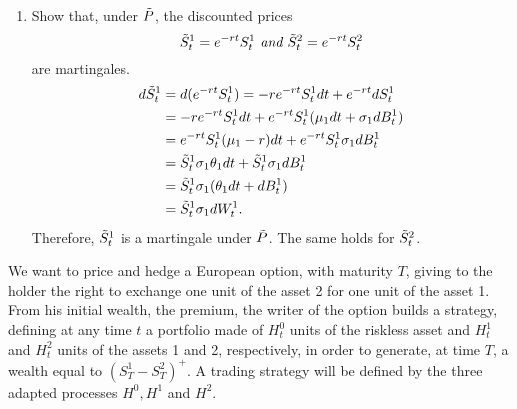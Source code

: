 \documentclass[11pt,a4,table]{article}
\begin{document}
\begin{enumerate}
\begin{enumerate}
        \item Show that, under $\Tilde{P}$, the discounted prices
        \begin{equation*}
            \Tilde{S}_t^1=e^{-rt}S_t^1 \textit{ and } \Tilde{S}_t^2 = e^{-rt} S_t^2
        \end{equation*}
        are martingales.\\
        \begin{align*}
            d\Tilde{S}_t^1 &= d(e^{-rt}S_t^1) = -re^{-rt}S_t^1 dt + e^{-rt} dS_t^1\\
            &= -re^{-rt}S_t^1 dt + e^{-rt}S_t^1(\mu_1 dt + \sigma_1 dB_t^1)\\
            &= e^{-rt}S_t^1(\mu_1 - r) dt + e^{-rt}S_t^1\sigma_1 dB_t^1\\
            &= \Tilde{S}_t^1\sigma_1\theta_1 dt + \Tilde{S}_t^1\sigma_1 dB_t^1\\
            &= \Tilde{S}_t^1\sigma_1(\theta_1 dt + dB_t^1)\\
            &= \Tilde{S}_t^1\sigma_1 dW_t^1.
        \end{align*}
        Therefore, $\Tilde{S}_t^1$ is a martingale under $\Tilde{P}$. The same holds for $\Tilde{S}_t^2$.
    \end{enumerate}
    
    We want to price and hedge a European option, with maturity $T$, giving to the holder the right to exchange one unit of the asset 2 for one unit of the asset 1. From his initial wealth, the premium, the writer of the option builds a strategy, defining at any time $t$ a portfolio made of $H_t^0$ units of the riskless asset and $H_t^1$ and $H_t^2$ units of the assets 1 and 2, respectively, in order to generate, at time $T$, a wealth equal to $(S_T^1-S_T^2)^+$. A trading strategy will be defined by the three adapted processes $H^0, H^1$ and $H^2$.
    \begin{enumerate}
        \setcounter{enumii}{3}
        

\end{enumerate}
\end{enumerate}
\end{document}
